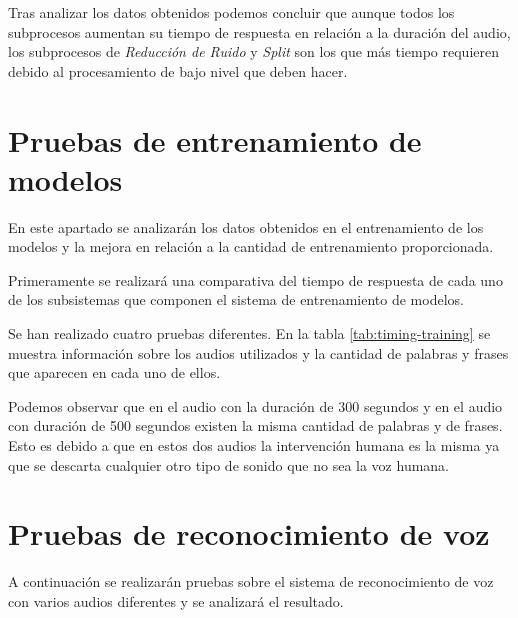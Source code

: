 \documentclass[../main.tex]{subfiles}
\begin{document}
Tras analizar los datos obtenidos podemos concluir que aunque todos los subprocesos aumentan su tiempo de respuesta en relación a la duración del audio, los subprocesos de \textit{Reducción de Ruido} y \textit{Split} son los que más tiempo requieren debido al procesamiento de bajo nivel que deben hacer.


\section{Pruebas de entrenamiento de modelos}\label{sec:val-train}
En este apartado se analizarán los datos obtenidos en el entrenamiento de los modelos y la mejora en relación a la cantidad de entrenamiento proporcionada.

Primeramente se realizará una comparativa del tiempo de respuesta de cada uno de los subsistemas que componen el sistema de entrenamiento de modelos.

Se han realizado cuatro pruebas diferentes. En la tabla \autoref{tab:timing-training} se muestra información sobre los audios utilizados y la cantidad de palabras y frases que aparecen en cada uno de ellos.

\begin{table}[]
    \centering
    \caption{Comparativa de tiempos, palabras y frases de los audios de entrenamiento.}
    \label{tab:timing-training}
\end{table}

Podemos observar que en el audio con la duración de 300 segundos y en el audio con duración de 500 segundos existen la misma cantidad de palabras y de frases. Esto es debido a que en estos dos audios la intervención humana es la misma ya que se descarta cualquier otro tipo de sonido que no sea la voz humana.

\section{Pruebas de reconocimiento de voz}\label{sec:val-s2t}
A continuación se realizarán pruebas sobre el sistema de reconocimiento de voz con varios audios diferentes y se analizará el resultado.
\end{document}
